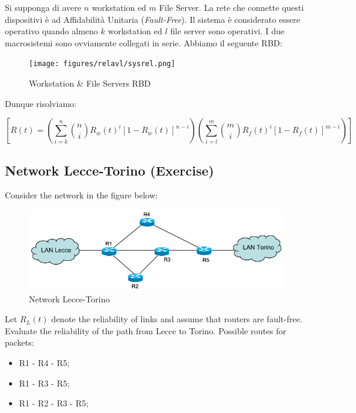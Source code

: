 Si supponga di avere $n$ workstation ed $m$ File Server. La rete che connette questi dispositivi è ad Affidabilità Unitaria (\textit{Fault-Free}). Il sistema è considerato essere operativo quando almeno $k$ workstation ed $l$ file server sono operativi. I due macrosistemi sono ovviamente collegati in serie. Abbiamo il seguente RBD:

\begin{center}
\begin{figure}[H]
\centering
\texttt{[image: figures/relavl/sysrel.png]}
\caption{Workstation \& File Servers RBD}
\end{figure}
\end{center}

Dunque risolviamo:

\[
	[R(t) = (\sum_{i=k}^n{\binom{n}{i}R_w(t)^i[1-R_w(t)]^{n-i}})(\sum_{i=l}^m{\binom{m}{i}R_f(t)^i[1-R_f(t)]^{m-i}})]
\]

\subsection{Network Lecce-Torino (Exercise)}

Consider the network in the figure below:

\begin{center}
\begin{figure}[H]
\centering
\includegraphics[scale=0.8]{figures/ex/nLT.png}
\caption{Network Lecce-Torino}
\end{figure}
\end{center}

Let $R_L(t)$ denote the reliability of links and assume that routers are fault-free. Evaluate the 
reliability of the path from Lecce to Torino. 
Possible routes for packets:  

\begin{itemize}

\item R1 - R4 - R5;
\item R1 - R3 - R5;
\item R1 - R2 - R3 - R5;

\end{itemize}


